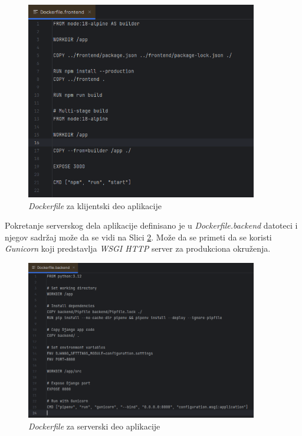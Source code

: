 \documentclass[12pt,oneside]{memoir}
\begin{document}
\begin{figure}[h]
\centering
\includegraphics[width=0.9\textwidth]{images/docker_frontend.png}
\caption{\emph{Dockerfile} za klijentski deo aplikacije}
\label{fig:docker_frontend}
\end{figure}

Pokretanje serverskog dela aplikacije definisano je u \emph{Dockerfile.backend} datoteci i njegov sadržaj može da se vidi na Slici \ref{fig:docker_backend}. Može da se primeti da se koristi \emph{Gunicorn} koji predstavlja \emph{WSGI HTTP} server za produkciona okruženja.

\begin{figure}[H]
\centering
\includegraphics[width=0.9\textwidth]{images/docker_backend.png}
\caption{\emph{Dockerfile} za serverski deo aplikacije}
\label{fig:docker_backend}
\end{figure}
\end{document}
